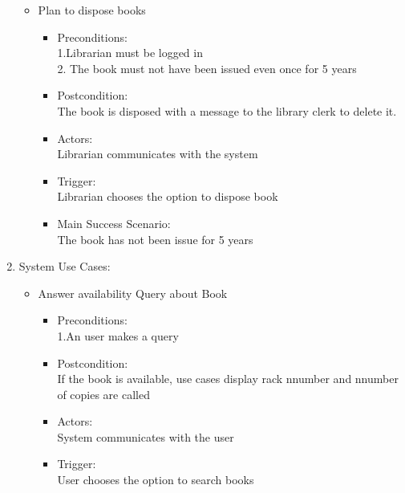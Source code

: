 \documentclass[a4paper]{article}
\begin{document}
\begin{enumerate}
\begin{itemize}
\item Plan to dispose books\\ 
 \begin{itemize}
  \item Preconditions:\\ 1.Librarian must be logged in\\ 2. The book must not have been issued even once for 5 years\\ 
 \item Postcondition:\\ The book is disposed with a message to the library clerk to delete it.\\ 
 \item Actors:\\  Librarian communicates with the system\\ 
 \item Trigger:\\  Librarian  chooses the option to dispose book\\ 
 \item Main Success Scenario:\\  The book has not been issue for 5 years\\ 
 \end{itemize}
 

\end{itemize}

\item System Use Cases:\\ 
 \begin{itemize}
 
  \item Answer availability Query about Book\\ 
	\begin{itemize}
	\item  Preconditions:\\ 1.An user makes a query\\ 
 \item Postcondition: \\ If the book is available, use cases display rack nnumber and nnumber of copies are called\\ 
 \item Actors:\\  System communicates with the user\\ 
 \item Trigger: \\ User chooses the option to search books\\ 
	\end{itemize}


\end{itemize}
\end{enumerate}
\end{document}
